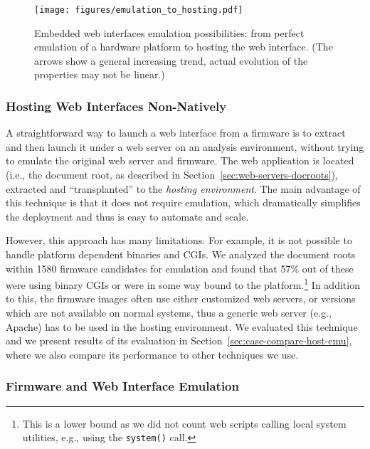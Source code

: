 \documentclass[conference]{./templates/ndss/IEEEtran}
\newcounter{t0d0_counter}
\newcounter{pr00f_counter}
\newcommand{\countfirmwareforemulation}{1580}
\newcommand{\PrcntFirmwareBinaryCGI}{57\%}
\begin{document}
\begin{figure}
  \center
\texttt{[image: figures/emulation\_to\_hosting.pdf]}
  \caption{Embedded web interfaces emulation possibilities: from
    perfect emulation of a hardware platform to hosting the web
    interface. (The arrows show a general increasing trend, actual
    evolution of the properties may not be linear.)
  }
  \label{fig:emul_hosting}
\end{figure}


\subsubsection{Hosting Web Interfaces Non-Natively}
\label{sec:technique-hosted}

A straightforward way to launch a web interface from a firmware is to
extract and then launch it under a web server
on an analysis environment, without trying to emulate the original web
server and firmware.
The web application is
located (i.e., the document root, as described in Section~\ref{sec:web-servers-docroots}),
extracted and ``transplanted'' to the \emph{hosting environment}.  
The main advantage of this technique is that it does not require emulation, 
which dramatically simplifies the deployment and thus is easy to automate and scale. 


However, this approach has many limitations. For example, it is not possible to handle platform dependent binaries and
CGIs. We analyzed the document roots within \countfirmwareforemulation{} firmware candidates for emulation and
found that \PrcntFirmwareBinaryCGI{} out of these were using binary
CGIs or were in some way bound to the platform.\footnote{This is a
  lower bound as we did not count web scripts calling local system
  utilities, e.g., using the \texttt{system()} call.} In addition to
this, the firmware images often use either customized web servers, or
versions which are not available on normal systems, thus a
generic web server (e.g., Apache) has to be used in the hosting environment.
We evaluated this technique and we present results of its evaluation in
Section~\ref{sec:case-compare-host-emu}, where we also compare its performance
to other techniques we use.












\subsubsection{Firmware and Web Interface Emulation}
\label{sec:dynamic-nativeemu}
\end{document}
